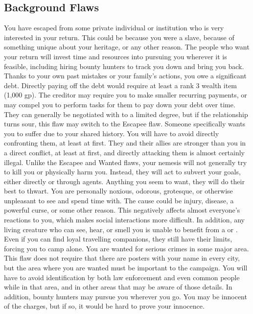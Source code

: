     \subsection{Background Flaws}
         You have escaped from some private individual or institution who is very interested in your return.
        This could be because you were a slave, because of something unique about your heritage, or any other reason.
        The people who want your return will invest time and resources into pursuing you wherever it is feasible, including hiring bounty hunters to track you down and bring you back.
         Thanks to your own past mistakes or your family's actions, you owe a significant debt.
        Directly paying off the debt would require at least a rank 3 wealth item (1,000 gp).
        The creditor may require you to make smaller recurring payments, or may compel you to perform tasks for them to pay down your debt over time.
        They can generally be negotiated with to a limited degree, but if the relationship turns sour, this flaw may switch to the Escapee flaw.
         Someone specifically wants you to suffer due to your shared history.
        You will have to avoid directly confronting them, at least at first.
        They and their allies are stronger than you in a direct conflict, at least at first, and directly attacking them is almost certainly illegal.
        Unlike the Escapee and Wanted flaws, your nemesis will not generally try to kill you or physically harm you.
        Instead, they will act to subvert your goals, either directly or through agents.
        Anything you seem to want, they will do their best to thwart.
         You are personally noxious, odorous, grotesque, or otherwise unpleasant to see and spend time with.
        The cause could be injury, disease, a powerful curse, or some other reason.
        This negatively affects almost everyone's reactions to you, which makes social interactions more difficult.
        In addition, any living creature who can see, hear, or smell you is unable to benefit from a  or .
        Even if you can find loyal travelling companions, they still have their limits, forcing you to camp alone.
         You are wanted for serious crimes in some major area.
        This flaw does not require that there are posters with your name in every city, but the area where you are wanted must be important to the campaign.
        You will have to avoid identification by both law enforcement and even common people while in that area, and in other areas that may be aware of those details.
        In addition, bounty hunters may pursue you wherever you go.
        You may be innocent of the charges, but if so, it would be hard to prove your innocence.

